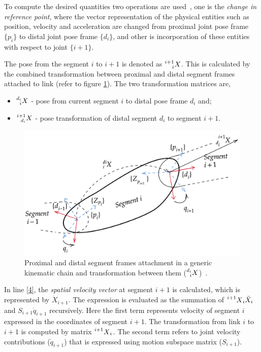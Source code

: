 To compute the desired quantities two operations are used~\cite{shakhimardanov2015composable}, one is the \textit{change in reference point}, where the vector representation of the physical entities such as position, velocity and acceleration are changed from proximal joint pose frame $\{p_i\}$ to distal joint pose frame $\{d_i\}$, and other is incorporation of these entities with respect to joint $\{i+1\}$.

The pose from the segment $i$ to $i+1$ is denoted as $\prescript{i+1}{i}{X}$. This is calculated by the combined transformation between proximal and distal segment frames attached to link (refer to figure \ref{fig:pose}). The two transformation matrices are, \begin{itemize}
	\item $\prescript{d_i}{i}{X}$ - pose from current segment $i$ to distal pose frame $d_i$ and;
	\item $\prescript{i+1}{d_i}{X}$ - pose transformation of distal segment $d_i$ to segment $i+1$. 
\end{itemize} 

\begin{figure}[h!]
		\label{fig:pose}
	\centering
	\includegraphics[scale=0.3]{images/pose.png}
	\caption{Proximal and distal segment frames attachment in a generic kinematic chain and transformation between them ($\prescript{d_i}{i}{X}$)~\cite{shakhimardanov2015composable}.}

\end{figure}

In line \ref{4}, the \textit{spatial velocity vector} at segment $i+1$ is calculated, which is represented by $\ddot{X}_{i+1}$. The expression is evaluated as the summation of $\prescript{i+1}{}{X}_i\ddot{X}_i$ and  $S_{i+1}\dot{q}_{i+1}$ recursively. Here the first term represents velocity of segment $i$ expressed in the coordinates of segment $i+1$. The transformation from link $i$ to $i+1$ is computed by matrix $\prescript{i+1}{}{X}_{i}$. The second term refers to joint velocity contributions ($\dot{q}_{i+1}$) that is expressed using motion subspace matrix ($S_{i+1}$).

